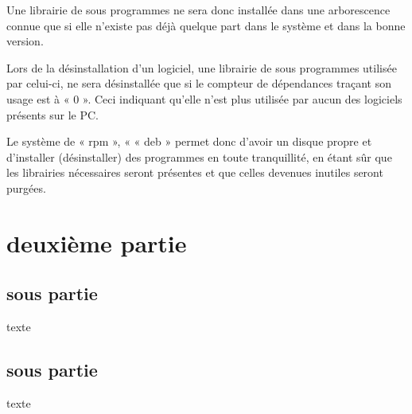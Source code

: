 \documentclass[a4paper,10pt]{article}
\begin{document}
Une librairie de sous programmes ne sera donc installée dans une arborescence connue que si elle n’existe pas déjà quelque part dans le système et dans la bonne version.

Lors de la désinstallation d’un logiciel, une librairie de sous programmes utilisée par celui-ci, ne sera désinstallée que si le compteur de dépendances traçant son usage est à « 0 ». Ceci indiquant qu’elle n’est plus utilisée par aucun des logiciels présents sur le PC.

Le système de « rpm », « « deb » permet donc d’avoir un disque propre et d’installer (désinstaller) des programmes en toute tranquillité, en étant sûr que les librairies nécessaires seront présentes et que celles devenues inutiles seront purgées.


\section{deuxième partie}

\subsection{sous partie}

texte

\subsection{sous partie}

texte
\end{document}
